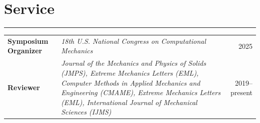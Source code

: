 \documentclass[11pt]{article}
\begin{document}
\section*{Service}\vspace{-0.7em}
\hrule
\vspace{1.0em}
\begin{tabularx}{\textwidth}{@{} l X r @{}}

\textbf{Symposium Organizer} & \textit{18th U.S. National Congress on Computational Mechanics} & 2025 \\

\textbf{Reviewer} &
\textit{Journal of the Mechanics and Physics of Solids (JMPS), Extreme Mechanics Letters (EML), Computer Methods in Applied Mechanics and Engineering (CMAME), Extreme Mechanics Letters (EML), International Journal of Mechanical Sciences (IJMS)} & 
2019--present \\

\end{tabularx}
\end{document}
